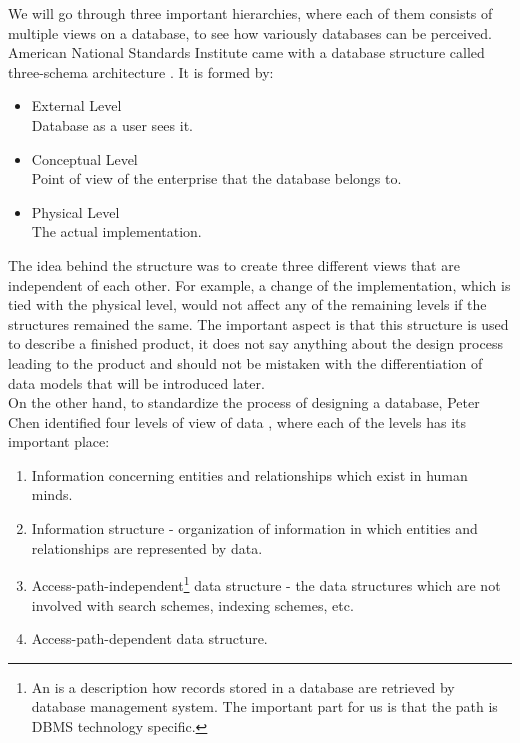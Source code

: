We will go through three important hierarchies, where each of them consists of multiple views on a database, to see how variously databases can be perceived.\\

American National Standards Institute came with a database structure called three-schema architecture \cite{ANSIArchitecture75}. It is formed by:
\begin{itemize}
	\item External Level \\ Database as a user sees it. 
	\item Conceptual Level \\ Point of view of the enterprise that the database belongs to.
	\item Physical Level \\ The actual implementation.
\end{itemize}

The idea behind the structure was to create three different views that are independent of each other. 
For example, a change of the implementation, which is tied with the physical level, would not affect any of the remaining levels if the structures remained the same. 
The important aspect is that this structure is used to describe a finished product, it does not say anything about the design process leading to the product and should not be mistaken with the differentiation of data models that will be introduced later.\\

On the other hand, to standardize the process of designing a database, Peter Chen identified four levels of view of data \cite{Chen76theentity-relationship}, where each of the levels has its important place: \\
\begin{enumerate}
	\item Information concerning entities and relationships which exist in human minds.
	\item Information structure - organization of information in which entities and relationships are represented by data.
	\item Access-path-independent\footnote{An  is a description how records stored in a database are retrieved by database management system\cite{AccessPathDefiniton}. The important part for us is that the path is DBMS technology specific.} data structure - the data structures which are not involved with search schemes, indexing schemes, etc.
	\item Access-path-dependent data structure.
\end{enumerate}

